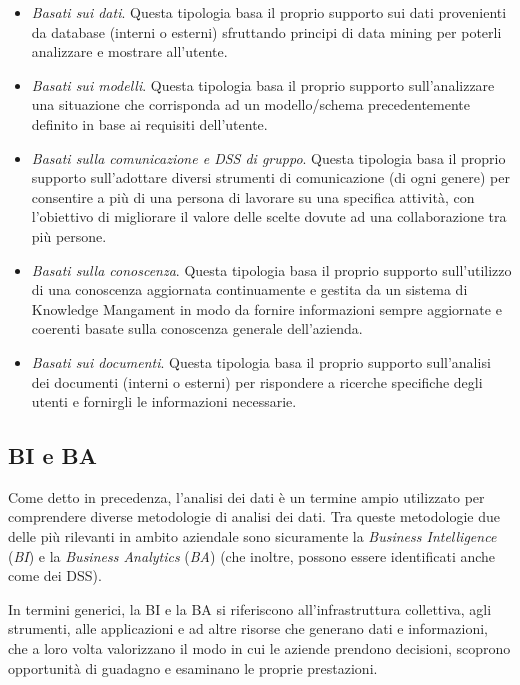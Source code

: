 \begin{itemize}
    \item \textit{Basati sui dati}. Questa tipologia basa il proprio supporto sui dati provenienti da database (interni o esterni) sfruttando principi di data mining per poterli analizzare e mostrare all'utente.
    \item \textit{Basati sui modelli}. Questa tipologia basa il proprio supporto sull'analizzare una situazione che corrisponda ad un modello/schema precedentemente definito in base ai requisiti dell'utente.
    \item \textit{Basati sulla comunicazione e DSS di gruppo}. Questa tipologia basa il proprio supporto sull'adottare diversi strumenti di comunicazione (di ogni genere) per consentire a più di una persona di lavorare su una specifica attività, con l'obiettivo di migliorare il valore delle scelte dovute ad una collaborazione tra più persone.
    \item \textit{Basati sulla conoscenza}. Questa tipologia basa il proprio supporto sull'utilizzo di una conoscenza aggiornata continuamente e gestita da un sistema di Knowledge Mangament in modo da fornire informazioni sempre aggiornate e coerenti basate sulla conoscenza generale dell'azienda.
    \item \textit{Basati sui documenti}. Questa tipologia basa il proprio supporto sull'analisi dei documenti (interni o esterni) per rispondere a ricerche specifiche degli utenti e fornirgli le informazioni necessarie. 
\end{itemize}


\subsection{BI e BA}
Come detto in precedenza, l'analisi dei dati è un termine ampio utilizzato per comprendere diverse metodologie di analisi dei dati. Tra queste metodologie due delle più rilevanti in ambito aziendale sono sicuramente la \textit{Business Intelligence} (\textit{BI}) e la \textit{Business Analytics} (\textit{BA}) (che inoltre, possono essere identificati anche come dei DSS).

In termini generici, la BI e la BA si riferiscono all'infrastruttura collettiva, agli strumenti, alle applicazioni e ad altre risorse che generano dati e informazioni, che a loro volta valorizzano il modo in cui le aziende prendono decisioni, scoprono opportunità di guadagno e esaminano le proprie prestazioni.\cite{hpe_bi_and_a}

